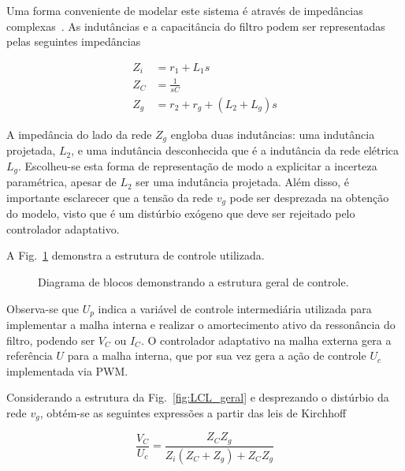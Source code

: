     Uma forma conveniente de modelar este sistema é através de impedâncias
    complexas~\cite{ref:XU}. As indutâncias e a capacitância do filtro podem ser
    representadas pelas seguintes impedâncias

    \begin{equation}
        \begin{split}
            Z_i & = r_1 + L_1 s \\
            Z_C & = \frac{1}{s C} \\
            Z_g & = r_2 + r_g + \left( L_2 + L_g \right) s
        \end{split}
    \end{equation}

    A impedância do lado da rede $Z_g$ engloba duas indutâncias: uma indutância projetada,
    $L_2$, e uma indutância desconhecida que é a indutância da rede elétrica $L_g$. Escolheu-se
    esta forma de representação de modo a explicitar a incerteza paramétrica, apesar de $L_2$
    ser uma indutância projetada. Além disso, é importante esclarecer que a tensão da rede
    $v_g$ pode ser desprezada na obtenção do modelo, visto que é um distúrbio exógeno que
    deve ser rejeitado pelo controlador adaptativo.

    A Fig.~\ref{fig:estrutura_geral_cascata} demonstra a estrutura de controle utilizada.

    \begin{figure}[htb]
        \centering{
            \def\svgwidth{0.9\textwidth}
            }
        \renewcommand\figurename{Fig.}
        \caption{Diagrama de blocos demonstrando a estrutura geral de controle.}
        \label{fig:estrutura_geral_cascata}
    \end{figure}

    Observa-se que $U_p$ indica a variável de controle intermediária utilizada para
    implementar a malha interna e realizar o amortecimento ativo da ressonância do filtro,
    podendo ser $V_C$ ou $I_C$. O controlador adaptativo na malha externa gera a referência
    $U$ para a malha interna, que por sua vez gera a ação de controle $U_c$ implementada
    via PWM.

    Considerando a estrutura da Fig.~\ref{fig:LCL_geral} e desprezando o distúrbio da
    rede $v_g$, obtém-se as seguintes expressões a partir das leis de Kirchhoff

    \begin{equation}
        \frac{V_C}{U_c} = \frac{Z_C Z_g}{Z_i \left( Z_C + Z_g \right) + Z_C Z_g}
        \label{eq:vc_uc}
    \end{equation}

